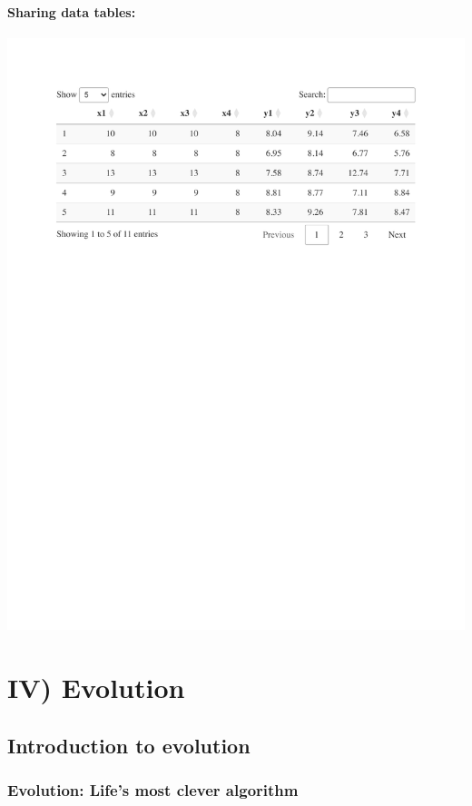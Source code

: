 \documentclass[
  letterpaper,
  DIV=11,
  numbers=noendperiod]{scrreprt}
\theoremstyle{definition}
\theoremstyle{remark}
\begin{document}
\subsection{Sharing data tables:}\label{sharing-data-tables-10}

\includegraphics{differentiation_practical_2_files/figure-pdf/tab-anscombe-1.pdf}

\part{IV) Evolution}

\chapter{Introduction to evolution}\label{introduction-to-evolution}

\section{Evolution: Life's most clever
algorithm}\label{evolution-lifes-most-clever-algorithm}
\end{document}
